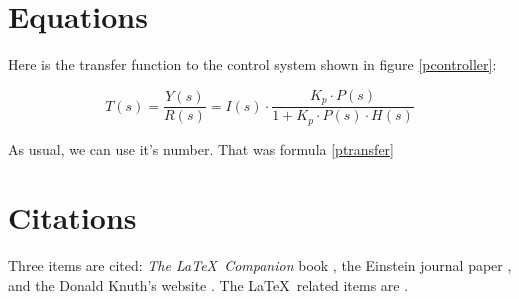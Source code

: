 \documentclass[twoside, 12pt]{article}
\begin{document}
	\section{Equations}

	Here is the transfer function to the control system shown in figure \ref{pcontroller}:

    \begin{equation}
        \label{ptransfer}
        T(s)=\frac{Y(s)}{R(s)}=I(s) \cdot \frac{K_p \cdot P(s)}{1 + K_p \cdot P(s) \cdot H(s)}
    \end{equation}

	As usual, we can use it's number. That was formula \eqref{ptransfer}

	\section{Citations}

	Three items are cited: \textit{The \LaTeX\ Companion} book \cite{latexcompanion}, the Einstein journal paper \cite{einstein}, and the Donald Knuth's website \cite{knuthwebsite}. The \LaTeX\ related items are \cite{latexcompanion,knuthwebsite}.

	
\end{document}

